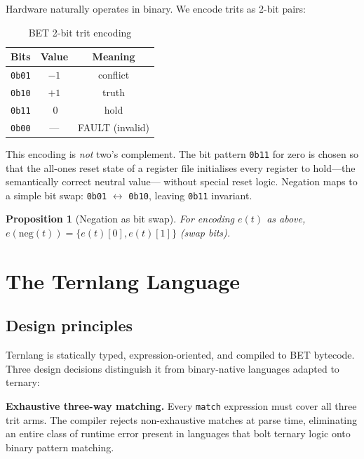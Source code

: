 \documentclass[11pt,a4paper]{article}
\newtheorem{proposition}{Proposition}
\begin{document}
Hardware naturally operates in binary. We encode trits as 2-bit pairs:

\begin{table}[htbp]
\centering
\small
\caption{BET 2-bit trit encoding}
\label{tab:encoding}
\begin{tabular}{ccc}
\toprule
Bits & Value & Meaning \\
\midrule
\texttt{0b01} & $-1$ & conflict \\
\texttt{0b10} & $+1$ & truth \\
\texttt{0b11} & $\ 0$ & hold \\
\texttt{0b00} & --- & FAULT (invalid) \\
\bottomrule
\end{tabular}
\end{table}

This encoding is \emph{not} two's complement. The bit pattern \texttt{0b11}
for zero is chosen so that the all-ones reset state of a register file
initialises every register to hold—the semantically correct neutral value—
without special reset logic. Negation maps to a simple bit swap:
\texttt{0b01} $\leftrightarrow$ \texttt{0b10}, leaving \texttt{0b11}
invariant.

\begin{proposition}[Negation as bit swap]
For encoding $e(t)$ as above, $e(\mathrm{neg}(t)) = \{e(t)[0], e(t)[1]\}$
(swap bits).
\end{proposition}

\section{The Ternlang Language}
\label{sec:language}

\subsection{Design principles}

Ternlang is statically typed, expression-oriented, and compiled to BET
bytecode. Three design decisions distinguish it from binary-native languages
adapted to ternary:

\textbf{Exhaustive three-way matching.} Every \texttt{match} expression must
cover all three trit arms. The compiler rejects non-exhaustive matches at
parse time, eliminating an entire class of runtime error present in languages
that bolt ternary logic onto binary pattern matching.
\end{document}
